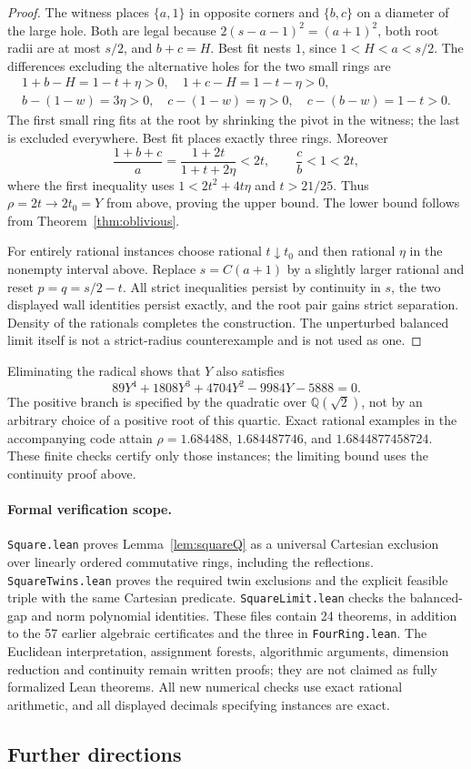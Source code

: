 \begin{proof}
The witness places $\{a,1\}$ in opposite corners and $\{b,c\}$
on a diameter of the large hole. Both are legal because
$2(s-a-1)^2=(a+1)^2$, both root radii are at most $s/2$, and
$b+c=H$. Best fit nests $1$, since $1<H<a<s/2$.
The differences excluding the alternative holes for the two
small rings are
\begin{gather*}
 1+b-H=1-t+\eta>0,\quad 1+c-H=1-t-\eta>0,\\
 b-(1-w)=3\eta>0,\quad c-(1-w)=\eta>0,\quad
 c-(b-w)=1-t>0.
\end{gather*}
The first small ring fits at the root by shrinking the pivot in
the witness; the last is excluded everywhere. Best fit places
exactly three rings. Moreover
\[
 \frac{1+b+c}{a}=\frac{1+2t}{1+t+2\eta}<2t,
 \qquad \frac cb<1<2t,
\]
where the first inequality uses $1<2t^2+4t\eta$ and $t>21/25$.
Thus $\rho=2t\to2t_0=Y$ from above, proving the upper bound.
The lower bound follows from Theorem~\ref{thm:oblivious}.

For entirely rational instances choose rational $t\downarrow t_0$
and then rational $\eta$ in the nonempty interval above. Replace
$s=C(a+1)$ by a slightly larger rational and reset $p=q=s/2-t$.
All strict inequalities persist by continuity in $s$, the two
displayed wall identities persist exactly, and the root pair gains
strict separation. Density of the rationals completes the construction.
The unperturbed balanced limit itself is not a strict-radius
counterexample and is not used as one.
\end{proof}

Eliminating the radical shows that $Y$ also satisfies
\[
 89Y^4+1808Y^3+4704Y^2-9984Y-5888=0.
\]
The positive branch is specified by the quadratic over $\mathbb Q(\sqrt2)$,
not by an arbitrary choice of a positive root of this quartic.
Exact rational examples in the accompanying code attain
$\rho=1.684488$, $1.684487746$, and $1.6844877458724$.
These finite checks certify only those instances; the limiting bound
uses the continuity proof above.

\paragraph{Formal verification scope.}
\texttt{Square.lean} proves Lemma~\ref{lem:squareQ} as a universal
Cartesian exclusion over linearly ordered commutative rings, including
the reflections. \texttt{SquareTwins.lean} proves the required twin
exclusions and the explicit feasible triple with the same Cartesian
predicate. \texttt{SquareLimit.lean} checks the balanced-gap and norm
polynomial identities. These files contain 24 theorems, in addition
to the 57 earlier algebraic certificates and the three in
\texttt{FourRing.lean}. The Euclidean interpretation,
assignment forests, algorithmic arguments, dimension reduction and
continuity remain written proofs; they are not claimed as fully
formalized Lean theorems. All new numerical checks use exact rational
arithmetic, and all displayed decimals specifying instances are exact.

\subsection{Further directions}\label{sec:furthergeneral}
